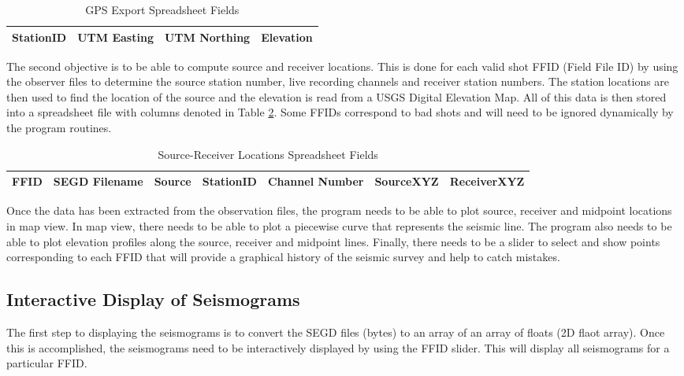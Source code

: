 \documentclass[11pt]{article}
\begin{document}
\begin{table}[H]
\caption{GPS Export Spreadsheet Fields}
\centering
\begin{tabular}{ c | c | c | c}
  \hline                  
  StationID & UTM Easting & UTM Northing & Elevation \\
  \hline
\end{tabular}
\label{TAB:GPS}
\end{table}

The second objective is to be able to compute source and receiver locations. This is done for each valid shot FFID (Field File ID) by using the observer files to determine the source station number, live recording channels and receiver station numbers. The station locations are then used to find the location of the source and the elevation is read from a USGS Digital Elevation Map. All of this data is then stored into a spreadsheet file with columns denoted in Table \ref{TAB:SRL}. Some FFIDs correspond to bad shots and will need to be ignored dynamically by the program routines. \\

\begin{table}[H]
\caption{Source-Receiver Locations Spreadsheet Fields}
\centering
\begin{tabular}{ l | l | l | l | l | l | l}
  \hline                  
  FFID & SEGD Filename & Source & StationID & Channel Number & SourceXYZ & ReceiverXYZ \\
  \hline
\end{tabular}
\label{TAB:SRL}
\end{table}

Once the data has been extracted from the observation files, the program needs to be able to plot source, receiver and midpoint locations in map view. In map view, there needs to be able to plot a piecewise curve that represents the seismic line. The program also needs to be able to plot elevation profiles along the source, receiver and midpoint lines. Finally, there needs to be a slider to select and show points corresponding to each FFID that will provide a graphical history of the seismic survey and help to catch mistakes. 

\subsection{Interactive Display of Seismograms}

The first step to displaying the seismograms is to convert the SEGD files (bytes) to an array of an array of floats (2D flaot array). Once this is accomplished, the seismograms need to be interactively displayed by using the FFID slider. This will display all seismograms for a particular FFID. \\
\end{document}
